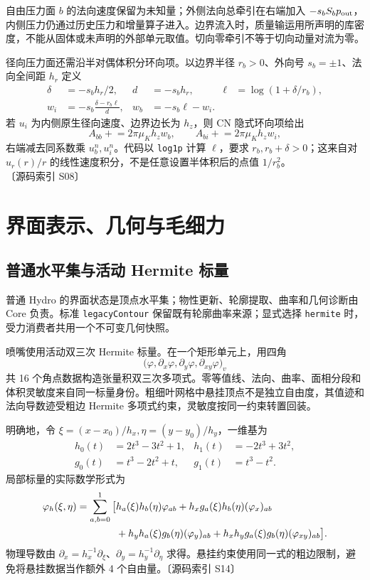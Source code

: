 \documentclass[UTF8,a4paper,11pt,fontset=fandol]{ctexart}
\newcommand{\code}[1]{\nolinkurl{#1}}
\newcommand{\src}[1]{\textcolor{ink}{\small〔源码索引 #1〕}}
\begin{document}
自由压力面 $b$ 的法向速度保留为未知量；外侧法向总牵引在右端加入 $-s_bS_bp_{\rm out}$，内侧压力仍通过历史压力和增量算子进入。边界流入时，质量输运用所声明的库密度，不能从固体或未声明的外部单元取值。切向零牵引不等于切向动量对流为零。

径向压力面还需沿半对偶体积分环向项。以边界半径 $r_b>0$、外向号 $s_b=\pm1$、法向全间距 $h_r$ 定义
\begin{align}
 \delta&=-s_bh_r/2,&d&=-s_bh_r,&\ell&=\log(1+\delta/r_b),\\
 w_i&=-s_b\frac{\delta-r_b\ell}{d},&w_b&=-s_b\ell-w_i.
\end{align}
若 $u_i$ 为内侧原生径向速度、边界边长为 $h_z$，则 CN 隐式环向项给出
\begin{equation}
 A_{bb}\mathrel{+}=2\pi\mu_Kh_z w_b,\qquad
 A_{bi}\mathrel{+}=2\pi\mu_Kh_z w_i,
\end{equation}
右端减去同系数乘 $u_b^n,u_i^n$。代码以 \code{log1p} 计算 $\ell$，要求 $r_b,r_b+\delta>0$；这来自对 $u_r(r)/r$ 的线性速度积分，不是任意设置半体积后的点值 $1/r_b^2$。\src{S08}

\section{界面表示、几何与毛细力}
\subsection{普通水平集与活动 Hermite 标量}
普通 Hydro 的界面状态是顶点水平集；物性更新、轮廓提取、曲率和几何诊断由 Core 负责。标准 \code{legacyContour} 保留既有轮廓曲率来源；显式选择 \code{hermite} 时，受力消费者共用一个不可变几何快照。

喷嘴使用活动双三次 Hermite 标量。在一个矩形单元上，用四角
\begin{equation}
 \big(\varphi,\partial_x\varphi,\partial_y\varphi,\partial_{xy}\varphi\big)_v
\end{equation}
共 16 个角点数据构造张量积双三次多项式。零等值线、法向、曲率、面相分段和体积灵敏度来自同一标量身份。粗细叶网格中悬挂顶点不是独立自由度，其值迹和法向导数迹受粗边 Hermite 多项式约束，灵敏度按同一约束转置回装。


明确地，令 $\xi=(x-x_0)/h_x,\eta=(y-y_0)/h_y$，一维基为
\begin{align}
 h_0(t)&=2t^3-3t^2+1,&h_1(t)&=-2t^3+3t^2,\\
 g_0(t)&=t^3-2t^2+t,&g_1(t)&=t^3-t^2.
\end{align}
局部标量的实际数学形式为
\begin{align}
 \varphi_h(\xi,\eta)=\sum_{a,b=0}^1\big[&h_a(\xi)h_b(\eta)\varphi_{ab}
 +h_xg_a(\xi)h_b(\eta)(\varphi_x)_{ab}\notag\\
 &+h_yh_a(\xi)g_b(\eta)(\varphi_y)_{ab}
 +h_xh_yg_a(\xi)g_b(\eta)(\varphi_{xy})_{ab}\big].
\end{align}
物理导数由 $\partial_x=h_x^{-1}\partial_\xi$、$\partial_y=h_y^{-1}\partial_\eta$ 求得。悬挂约束使用同一式的粗边限制，避免将悬挂数据当作额外 4 个自由量。\src{S14}
\end{document}
